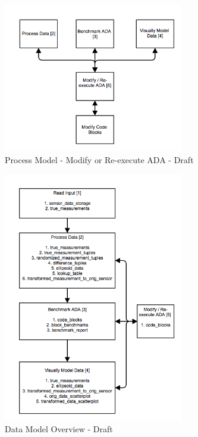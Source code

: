 \documentclass[twoside]{article}
\begin{document}
\begin{figure}[h]
    \centering
	\includegraphics[width=0.7\textwidth]{"images/process_model_modify_or_re_execute_ada_5_"}
    \caption{Process Model - Modify or Re-execute ADA - Draft}
    \label{fig:process_model_modify_or_recreae_ada_draft}
\end{figure}

\begin{figure}[h]
    \centering
	\includegraphics[width=0.7\textwidth]{"images/data_model_overview"}
    \caption{Data Model Overview - Draft}
    \label{fig:data_model_overview_draft}
\end{figure}
\end{document}
